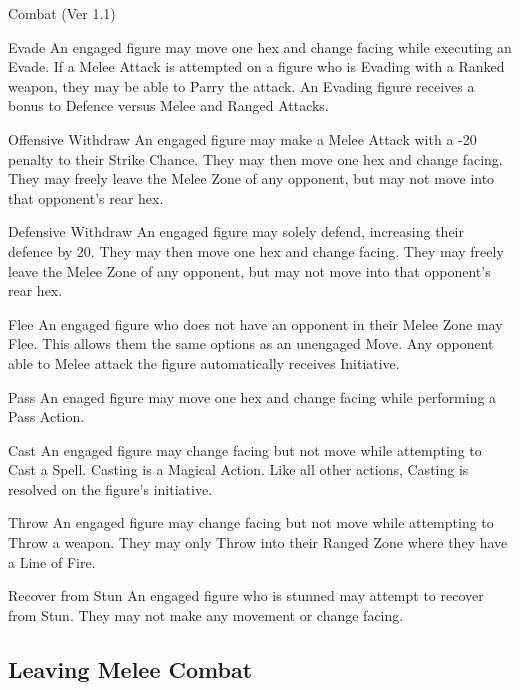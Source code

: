 \begin{Chapter}{Combat (Ver 1.1)}
\begin{Description}
\item[Evade] An engaged figure may move one hex and change facing
  while executing an Evade. If a Melee Attack is attempted on a figure
  who is Evading with a Ranked weapon, they may be able to Parry the
  attack.  An Evading figure receives a bonus to Defence versus Melee
  and Ranged Attacks.

\item[Offensive Withdraw] An engaged figure may make a Melee Attack
  with a -20 penalty to their Strike Chance.  They may then move one
  hex and change facing.  They may freely leave the Melee Zone of any
  opponent, but may not move into that opponent’s rear hex.

\item[Defensive Withdraw] An engaged figure may solely defend,
  increasing their defence by 20. They may then move one hex and
  change facing.  They may freely leave the Melee Zone of any
  opponent, but may not move into that opponent’s rear hex.

\item[Flee] An engaged figure who does not have an opponent in their
  Melee Zone may Flee.  This allows them the same options as an
  unengaged Move.  Any opponent able to Melee attack the figure
  automatically receives Initiative.

\item[Pass] An enaged figure may move one hex and change facing while
  performing a Pass Action.

\item[Cast] An engaged figure may change facing but not move while
  attempting to Cast a Spell. Casting is a Magical Action.  Like all
  other actions, Casting is resolved on the figure’s initiative.

\item[Throw]An engaged figure may change facing but not move while
  attempting to Throw a weapon.  They may only Throw into their Ranged
  Zone where they have a Line of Fire.

\item[Recover from Stun] An engaged figure who is stunned may attempt
  to recover from Stun.  They may not make any movement or change
  facing.

\end{Description}

\subsection{Leaving Melee Combat}


\end{Chapter}
